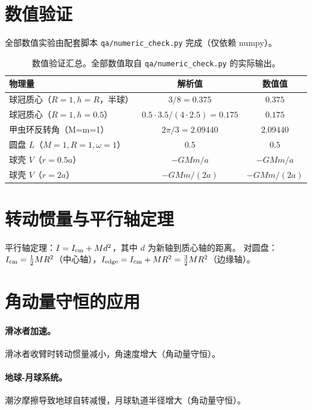 \documentclass[UTF8,a4paper,11pt]{ctexart}
\begin{document}
\section{数值验证}
\label{sec:numeric}

全部数值实验由配套脚本 \texttt{qa/numeric\_check.py} 完成（仅依赖 numpy）。

\begin{table}[htbp]
\centering
\small
\begin{tabular}{p{5cm}cc}
\toprule
物理量 & 解析值 & 数值值 \\
\midrule
球冠质心（$R=1,h=R$，半球） & $3/8=0.375$ & $0.375$ \\
球冠质心（$R=1,h=0.5$） & $0.5\cdot3.5/(4\cdot2.5)=0.175$ & $0.175$ \\
甲虫环反转角（M=m=1） & $2\pi/3=2.09440$ & $2.09440$ \\
圆盘 $L$（$M=1,R=1,\omega=1$） & $0.5$ & $0.5$ \\
球壳 $V$（$r=0.5a$） & $-GMm/a$ & $-GMm/a$ \\
球壳 $V$（$r=2a$） & $-GMm/(2a)$ & $-GMm/(2a)$ \\
\bottomrule
\end{tabular}
\caption{数值验证汇总。全部数值取自 \texttt{qa/numeric\_check.py} 的实际输出。}
\label{tab:numeric}
\end{table}

\section{转动惯量与平行轴定理}
\label{sec:parallel-axis}

平行轴定理：$I=I_{\rm cm}+Md^2$，其中 $d$ 为新轴到质心轴的距离。
对圆盘：$I_{\rm cm}=\frac12 MR^2$（中心轴），$I_{\rm edge}=I_{\rm cm}+MR^2=\frac32 MR^2$（边缘轴）。

\section{角动量守恒的应用}
\label{sec:angular-momentum-apps}

\paragraph{滑冰者加速。}
滑冰者收臂时转动惯量减小，角速度增大（角动量守恒）。

\paragraph{地球-月球系统。}
潮汐摩擦导致地球自转减慢，月球轨道半径增大（角动量守恒）。
\end{document}
